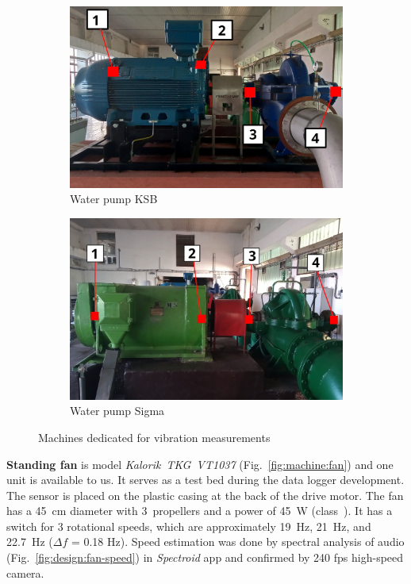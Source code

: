 \begin{figure}[h]
\begin{subfigure}[b]{0.49\textwidth}
        \includegraphics[width=\textwidth]{assets/design/sensor/ksb-pump.jpg}
        \caption{\footnotesize Water pump KSB}
        \label{fig:machine:pump-ksb}
    \end{subfigure}
    \hfill
    \begin{subfigure}[b]{0.49\textwidth}
    		\centering
        \includegraphics[width=\textwidth]{assets/design/sensor/sigma-pump.jpg}
        \caption{\footnotesize Water pump Sigma}
        \label{fig:machine:pump-sigma}
    \end{subfigure}
    \caption{Machines dedicated for vibration measurements}
    \label{fig:design:machines}
\end{figure}

\textbf{Standing fan} is model \emph{Kalorik~TKG~VT1037} (Fig.~\ref{fig:machine:fan}) and one unit is available to us. It serves as a test bed during the data logger development. The sensor is placed on the plastic casing at the back of the drive motor. The fan has a 45~cm diameter with 3~propellers and a power of 45~W (class~). It has a switch for 3 rotational speeds, which are approximately 19~Hz, 21~Hz, and 22.7~Hz ($\Delta f$ = 0.18 Hz). Speed estimation was done by spectral analysis of audio (Fig.~\ref{fig:design:fan-speed}) in \emph{Spectroid} app and confirmed by 240 fps high-speed camera.

